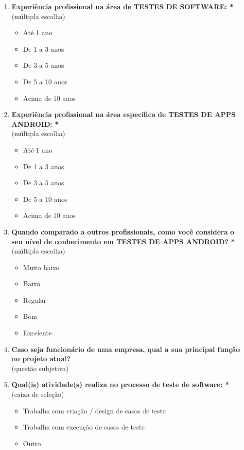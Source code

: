 \begin{enumerate}[label=\bf A\arabic*,leftmargin=1.8cm]
\begin{enumerate}[label= \arabic*]
        
        \item \textbf{Experiência profissional na área de TESTES DE SOFTWARE: *}\\
        (múltipla escolha)
        \begin{itemize}
            \item Até 1 ano
            \item De 1 a 3 anos
            \item De 3 a 5 anos
            \item De 5 a 10 anos
            \item Acima de 10 anos
        \end{itemize}
        
        \item \textbf{Experiência profissional na área específica de TESTES DE APPS ANDROID: *}\\
        (múltipla escolha)
        \begin{itemize}
            \item Até 1 ano
            \item De 1 a 3 anos
            \item De 3 a 5 anos
            \item De 5 a 10 anos
            \item Acima de 10 anos
        \end{itemize}
        
        \item \textbf{Quando comparado a outros profissionais, como você considera o seu nível de conhecimento em TESTES DE \ac{APPS} ANDROID? *}\\
        (múltipla escolha)
        \begin{itemize}
            \item Muito baixo
            \item Baixo
            \item Regular
            \item Bom
            \item Excelente
        \end{itemize}
        
        \item \textbf{Caso seja funcionário de uma empresa, qual a sua principal função no projeto atual?}\\
        (questão subjetiva)
        
        \item \textbf{Qual(is) atividade(s) realiza no processo de teste de software: *}\\
        (caixa de seleção)
        \begin{itemize}
            \item Trabalha com criação / design de casos de teste
            \item Trabalha com execução de casos de teste
            \item Outro
        \end{itemize}        
        

\end{enumerate}
\end{enumerate}
